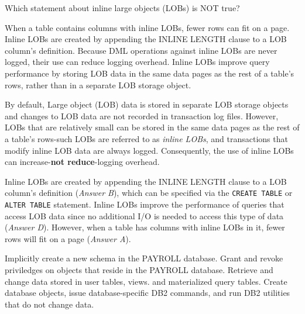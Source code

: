 \documentclass[answers, 11pt]{exam}
\begin{document}
\begin{questions}
\begin{solution}
\end{solution}

\question[1]
Which statement about inline large objects (LOBs) is NOT true?
\begin{choices} 
\choice When a table contains columns with inline LOBs, fewer rows can fit on a page.
\choice Inline LOBs are created by appending the INLINE LENGTH clause to a LOB column's definition.
\CorrectChoice Because DML operations against inline LOBs are never logged, their use can reduce logging overhead.
\choice Inline LOBs improve query performance by storing LOB data in the same data pages as the rest of a
table's rows, rather than in a separate LOB storage object.
\end{choices}

\begin{solution}
By default, Large object (LOB) data is stored in separate LOB storage objects and changes to LOB data
are not recorded in transaction log files. However, LOBs that are relatively small can be stored in the
same data pages as the rest of a table's rows-such LOBs are referred to as \textit{inline LOBs}, and
transactions that modify inline LOB data are always logged. Consequently, the use of inline LOBs can
increase-\textbf{not reduce}-logging overhead.
\par

Inline LOBs are created by appending the INLINE LENGTH clause to a LOB column's definition (\textit{Answer B}), which can be specified via the \texttt{CREATE TABLE} or \texttt{ALTER TABLE} statement. Inline LOBs
improve the performance of queries that access LOB data since no additional I/O is needed to access
this type of data (\textit{Answer D}). However, when a table has columns with inline LOBs in it,
fewer rows will fit on a page (\textit{Answer A}).

\end{solution}

\newpage
\addpoints
{}

\begin{choices}
	\choice Implicitly create a new schema in the PAYROLL database.
	\choice Grant and revoke priviledges on objects that reside in the PAYROLL database.
	\CorrectChoice Retrieve and change data stored in user tables, views. and materialized query tables.
	\choice Create database objects, issue database-specific DB2 commands, and run DB2 utilities that 
	do not change data.
\end{choices}


\end{questions}
\end{document}
